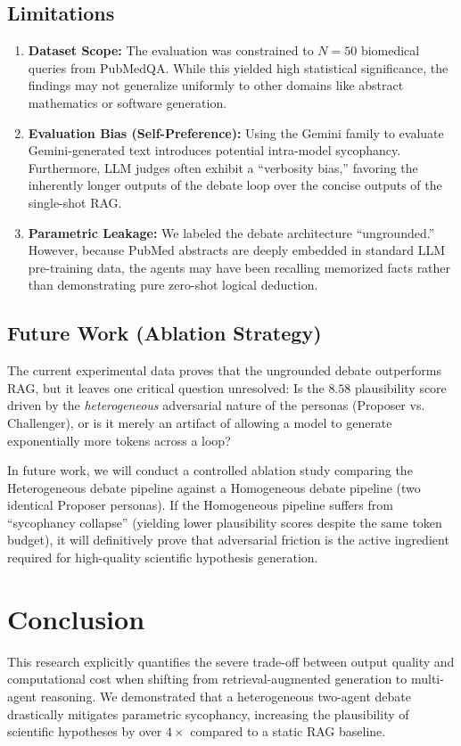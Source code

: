 \documentclass[11pt, conference, onecolumn]{IEEEtran}
\begin{document}
\subsection{Limitations}
\begin{enumerate}
    \item \textbf{Dataset Scope:} The evaluation was constrained to $N=50$ biomedical queries from PubMedQA. While this yielded high statistical significance, the findings may not generalize uniformly to other domains like abstract mathematics or software generation.
    \item \textbf{Evaluation Bias (Self-Preference):} Using the Gemini family to evaluate Gemini-generated text introduces potential intra-model sycophancy. Furthermore, LLM judges often exhibit a ``verbosity bias,'' favoring the inherently longer outputs of the debate loop over the concise outputs of the single-shot RAG.
    \item \textbf{Parametric Leakage:} We labeled the debate architecture ``ungrounded.'' However, because PubMed abstracts are deeply embedded in standard LLM pre-training data, the agents may have been recalling memorized facts rather than demonstrating pure zero-shot logical deduction.
\end{enumerate}

\subsection{Future Work (Ablation Strategy)}
The current experimental data proves that the ungrounded debate outperforms RAG, but it leaves one critical question unresolved: Is the $8.58$ plausibility score driven by the \textit{heterogeneous} adversarial nature of the personas (Proposer vs. Challenger), or is it merely an artifact of allowing a model to generate exponentially more tokens across a loop? 

In future work, we will conduct a controlled ablation study comparing the Heterogeneous debate pipeline against a Homogeneous debate pipeline (two identical Proposer personas). If the Homogeneous pipeline suffers from ``sycophancy collapse'' (yielding lower plausibility scores despite the same token budget), it will definitively prove that adversarial friction is the active ingredient required for high-quality scientific hypothesis generation.

\section{Conclusion}
This research explicitly quantifies the severe trade-off between output quality and computational cost when shifting from retrieval-augmented generation to multi-agent reasoning. We demonstrated that a heterogeneous two-agent debate drastically mitigates parametric sycophancy, increasing the plausibility of scientific hypotheses by over $4\times$ compared to a static RAG baseline. 
\end{document}
